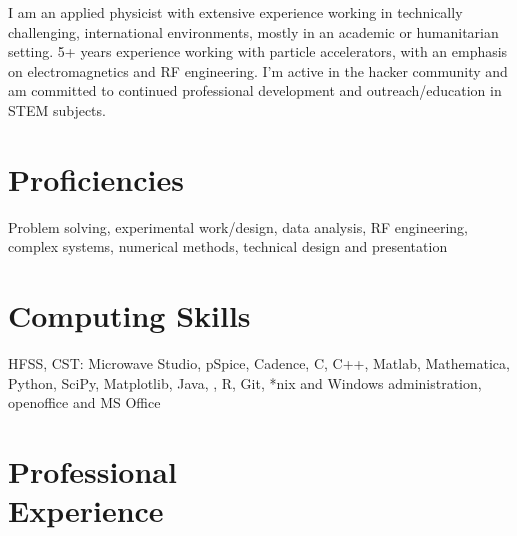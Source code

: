 \documentclass[margin,line]{resume}
\begin{document}
\begin{resume}
    I am an applied physicist with extensive experience working in technically challenging, international environments, mostly in an academic or humanitarian setting. 5+ years experience working with particle accelerators, with an emphasis on electromagnetics and RF engineering. I'm active in the hacker community and am committed to continued professional development and outreach/education in STEM subjects.


    \section{\mysidestyle Proficiencies}

Problem solving, experimental work/design, data analysis, RF engineering, complex systems, numerical methods, technical design and presentation


    \section{\mysidestyle Computing Skills} 

    HFSS, CST: Microwave Studio, pSpice, Cadence, C, C++, Matlab, Mathematica, Python, SciPy, Matplotlib, Java, \LaTeXe, R, Git, *nix and Windows administration, openoffice and MS Office

    \section{\mysidestyle Professional\\Experience}


\end{resume}
\end{document}
